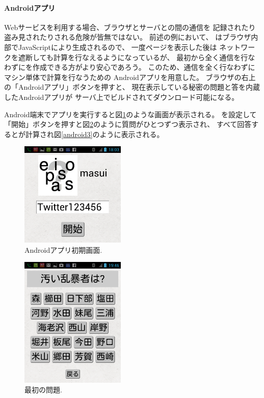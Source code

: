 \documentclass[twoside]{wiss}
\begin{document}
\paragraph{Androidアプリ}

Webサービスを利用する場合、ブラウザとサーバとの間の通信を
記録されたり盗み見されたりされる危険が皆無ではない。
前述の例において、
{\PW}はブラウザ内部でJavaScriptにより生成されるので、
一度ページを表示した後は
ネットワークを遮断しても{\PW}計算を行なえるようになっているが、
最初から全く通信を行なわずに{\PW}を作成できる方がより安心であろう。
このため、通信を全く行なわずにマシン単体で{\PW}計算を行なうための
Androidアプリを用意した。
ブラウザの右上の「Androidアプリ」ボタンを押すと、
現在表示している秘密の問題と答を内蔵したAndroidアプリが
サーバ上でビルドされてダウンロード可能になる。

Android端末でアプリを実行すると図\ref{android1}のような画面が表示される。
{\SS}を設定して「開始」ボタンを押すと図\ref{android2}のように質問がひとつずつ表示され、
すべて回答すると{\PW}が計算され図\ref{android3}のように表示される。

\begin{figure}[H]
\centerline{\includegraphics[width=50mm,bb=0 0 720 720]{figures/android1crop.png}}
\caption{Androidアプリ初期画面.}
\label{android1}
\end{figure}

\begin{figure}[H]
\centerline{\includegraphics[width=50mm,bb=0 0 720 900]{figures/android2crop.png}}
\caption{最初の問題.}
\label{android2}
\end{figure}
\end{document}

